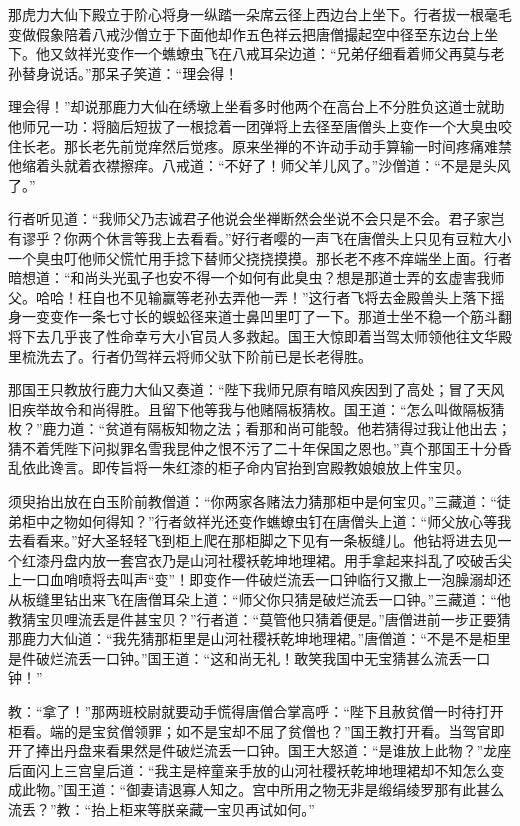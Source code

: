 \documentclass[12pt,UTF8]{ctexbook}
\begin{document}
{那虎力大仙下殿立于阶心将身一纵踏一朵席云径上西边台上坐下。行者拔一根毫毛变做假象陪着八戒沙僧立于下面他却作五色祥云把唐僧撮起空中径至东边台上坐下。他又敛祥光变作一个蟭蟟虫飞在八戒耳朵边道：“兄弟仔细看着师父再莫与老孙替身说话。”那呆子笑道：“理会得！

理会得！”却说那鹿力大仙在绣墩上坐看多时他两个在高台上不分胜负这道士就助他师兄一功：将脑后短拔了一根捻着一团弹将上去径至唐僧头上变作一个大臭虫咬住长老。那长老先前觉痒然后觉疼。原来坐禅的不许动手动手算输一时间疼痛难禁他缩着头就着衣襟擦痒。八戒道：“不好了！师父羊儿风了。”沙僧道：“不是是头风了。”

行者听见道：“我师父乃志诚君子他说会坐禅断然会坐说不会只是不会。君子家岂有谬乎？你两个休言等我上去看看。”好行者嘤的一声飞在唐僧头上只见有豆粒大小一个臭虫叮他师父慌忙用手捻下替师父挠挠摸摸。那长老不疼不痒端坐上面。行者暗想道：“和尚头光虱子也安不得一个如何有此臭虫？想是那道士弄的玄虚害我师父。哈哈！枉自也不见输赢等老孙去弄他一弄！”这行者飞将去金殿兽头上落下摇身一变变作一条七寸长的蜈蚣径来道士鼻凹里叮了一下。那道士坐不稳一个筋斗翻将下去几乎丧了性命幸亏大小官员人多救起。国王大惊即着当驾太师领他往文华殿里梳洗去了。行者仍驾祥云将师父驮下阶前已是长老得胜。

那国王只教放行鹿力大仙又奏道：“陛下我师兄原有暗风疾因到了高处；冒了天风旧疾举故令和尚得胜。且留下他等我与他赌隔板猜枚。国王道：“怎么叫做隔板猜枚？”鹿力道：“贫道有隔板知物之法；看那和尚可能彀。他若猜得过我让他出去；猜不着凭陛下问拟罪名雪我昆仲之恨不污了二十年保国之恩也。”真个那国王十分昏乱依此谗言。即传旨将一朱红漆的柜子命内官抬到宫殿教娘娘放上件宝贝。

须臾抬出放在白玉阶前教僧道：“你两家各赌法力猜那柜中是何宝贝。”三藏道：“徒弟柜中之物如何得知？”行者敛祥光还变作蟭蟟虫钉在唐僧头上道：“师父放心等我去看看来。”好大圣轻轻飞到柜上爬在那柜脚之下见有一条板缝儿。他钻将进去见一个红漆丹盘内放一套宫衣乃是山河社稷袄乾坤地理裙。用手拿起来抖乱了咬破舌尖上一口血哨喷将去叫声“变”！即变作一件破烂流丢一口钟临行又撒上一泡臊溺却还从板缝里钻出来飞在唐僧耳朵上道：“师父你只猜是破烂流丢一口钟。”三藏道：“他教猜宝贝哩流丢是件甚宝贝？”行者道：“莫管他只猜着便是。”唐僧进前一步正要猜那鹿力大仙道：“我先猜那柜里是山河社稷袄乾坤地理裙。”唐僧道：“不是不是柜里是件破烂流丢一口钟。”国王道：“这和尚无礼！敢笑我国中无宝猜甚么流丢一口钟！”

教：“拿了！”那两班校尉就要动手慌得唐僧合掌高呼：“陛下且赦贫僧一时待打开柜看。端的是宝贫僧领罪；如不是宝却不屈了贫僧也？”国王教打开看。当驾官即开了捧出丹盘来看果然是件破烂流丢一口钟。国王大怒道：“是谁放上此物？”龙座后面闪上三宫皇后道：“我主是梓童亲手放的山河社稷袄乾坤地理裙却不知怎么变成此物。”国王道：“御妻请退寡人知之。宫中所用之物无非是缎绢绫罗那有此甚么流丢？”教：“抬上柜来等朕亲藏一宝贝再试如何。”

}
\end{document}
